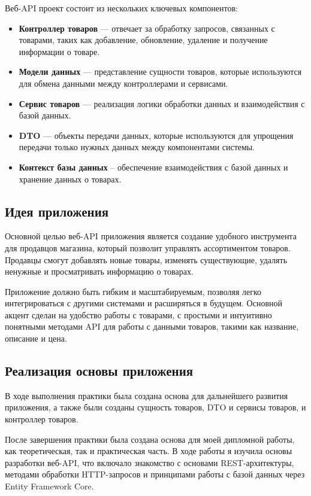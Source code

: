 \documentclass[a4paper,12pt]{report}
\begin{document}
Веб-\ac{API} проект состоит из нескольких ключевых компонентов:
\begin{itemize}
  \item
  \textbf{Контроллер товаров} --- отвечает за обработку запросов, связанных с товарами, таких как добавление, обновление, удаление и получение информации о товаре.
  \item 
  \textbf{Модели данных} --- представление сущности товаров, которые используются для обмена данными между контроллерами и сервисами.
  \item
  \textbf{Сервис товаров} --- реализация логики обработки данных и взаимодействия с базой данных.
  \item
  \textbf{\ac{DTO}} --- объекты передачи данных, которые используются для упрощения передачи только нужных данных между компонентами системы.
  \item
  \textbf{Контекст базы данных} -- обеспечение взаимодействия с базой данных и хранение данных о товарах.
\end{itemize}

\subsection{Идея приложения}

Основной целью веб-\ac{API} приложения является создание удобного инструмента для продавцов магазина, 
который позволит управлять ассортиментом товаров. Продавцы смогут добавлять новые товары, 
изменять существующие, удалять ненужные и просматривать информацию о товарах.

Приложение должно быть гибким и масштабируемым, позволяя легко интегрироваться с другими системами и расширяться в будущем. 
Основной акцент сделан на удобство работы с товарами, с простыми и интуитивно понятными методами \ac{API} для работы с данными товаров, 
такими как название, описание и цена.

\subsection{Реализация основы приложения}

В ходе выполнения практики была создана основа для дальнейшего развития приложения, а также были созданы сущность товаров, DTO и сервисы товаров, 
и контроллер товаров.


После завершения практики была создана основа для моей дипломной работы, как теоретическая, так и практическая часть. 
В ходе работы я изучила основы разработки веб-\ac{API}, что включало знакомство с основами \ac{REST}-архитектуры, методами обработки 
\ac{HTTP}-запросов и принципами работы с базой данных через Entity Framework Core.
\end{document}
